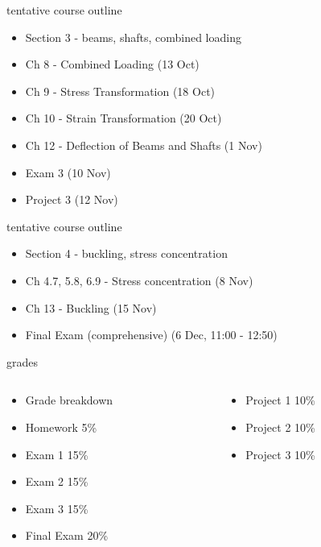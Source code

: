 \documentclass[12pt,handout]{beamer}
\providecommand{\tightlist}{%
  \setlength{\itemsep}{0pt}\setlength{\parskip}{0pt}}
\providecommand{\tightlist}{%
\setlength{\itemsep}{0pt}\setlength{\parskip}{0pt}}
\begin{document}
\begin{frame}{tentative course outline}
\protect\hypertarget{tentative-course-outline-2}{}
\begin{itemize}
\tightlist
\item
  Section 3 - beams, shafts, combined loading
\item
  Ch 8 - Combined Loading (13 Oct)
\item
  Ch 9 - Stress Transformation (18 Oct)
\item
  Ch 10 - Strain Transformation (20 Oct)
\item
  Ch 12 - Deflection of Beams and Shafts (1 Nov)
\item
  Exam 3 (10 Nov)
\item
  Project 3 (12 Nov)
\end{itemize}
\end{frame}

\begin{frame}{tentative course outline}
\protect\hypertarget{tentative-course-outline-3}{}
\begin{itemize}
\tightlist
\item
  Section 4 - buckling, stress concentration
\item
  Ch 4.7, 5.8, 6.9 - Stress concentration (8 Nov)
\item
  Ch 13 - Buckling (15 Nov)
\item
  Final Exam (comprehensive) (6 Dec, 11:00 - 12:50)
\end{itemize}
\end{frame}

\begin{frame}{grades}
\protect\hypertarget{grades}{}
\begin{columns}[T]
\begin{column}{0.5\textwidth}
\begin{itemize}
\tightlist
\item
  Grade breakdown
\item
  Homework 5\%
\item
  Exam 1 15\%
\item
  Exam 2 15\%
\item
  Exam 3 15\%
\item
  Final Exam 20\%
\end{itemize}
\end{column}

\begin{column}{0.5\textwidth}
\begin{itemize}
\tightlist
\item
  Project 1 10\%
\item
  Project 2 10\%
\item
  Project 3 10\%
\end{itemize}
\end{column}
\end{columns}
\end{frame}
\end{document}
